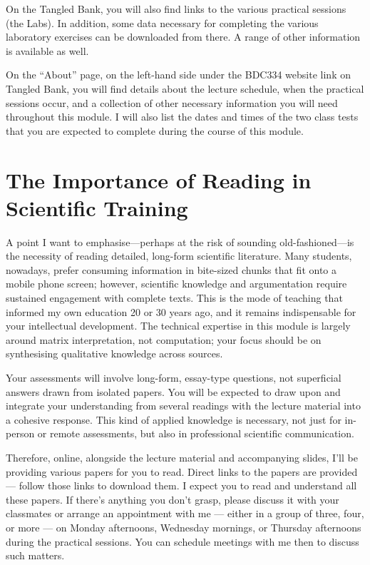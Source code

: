 \documentclass[
  10pt,
]{book}
\begin{document}
On the Tangled Bank, you will also find links to the various practical
sessions (the Labs). In addition, some data necessary for completing the
various laboratory exercises can be downloaded from there. A range of
other information is available as well.

On the ``About'' page, on the left-hand side under the BDC334 website
link on Tangled Bank, you will find details about the lecture schedule,
when the practical sessions occur, and a collection of other necessary
information you will need throughout this module. I will also list the
dates and times of the two class tests that you are expected to complete
during the course of this module.

\section{The Importance of Reading in Scientific
Training}\label{the-importance-of-reading-in-scientific-training}

A point I want to emphasise---perhaps at the risk of sounding
old-fashioned---is the necessity of reading detailed, long-form
scientific literature. Many students, nowadays, prefer consuming
information in bite-sized chunks that fit onto a mobile phone screen;
however, scientific knowledge and argumentation require sustained
engagement with complete texts. This is the mode of teaching that
informed my own education 20 or 30 years ago, and it remains
indispensable for your intellectual development. The technical expertise
in this module is largely around matrix interpretation, not computation;
your focus should be on synthesising qualitative knowledge across
sources.

Your assessments will involve long-form, essay-type questions, not
superficial answers drawn from isolated papers. You will be expected to
draw upon and integrate your understanding from several readings with
the lecture material into a cohesive response. This kind of applied
knowledge is necessary, not just for in-person or remote assessments,
but also in professional scientific communication.

Therefore, online, alongside the lecture material and accompanying
slides, I'll be providing various papers for you to read. Direct links
to the papers are provided --- follow those links to download them. I
expect you to read and understand all these papers. If there's anything
you don't grasp, please discuss it with your classmates or arrange an
appointment with me --- either in a group of three, four, or more --- on
Monday afternoons, Wednesday mornings, or Thursday afternoons during the
practical sessions. You can schedule meetings with me then to discuss
such matters.
\end{document}
